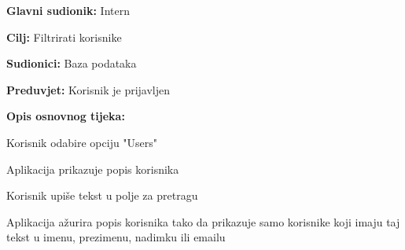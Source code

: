 					\noindent {}
					\begin{packed_item}

						\item \textbf{Glavni sudionik:} Intern
						\item \textbf{Cilj:} Filtrirati korisnike
						\item \textbf{Sudionici:} Baza podataka
						\item \textbf{Preduvjet:} Korisnik je prijavljen
						\item \textbf{Opis osnovnog tijeka:}

						\item[] \begin{packed_enum}

							\item Korisnik odabire opciju "Users"
							\item Aplikacija prikazuje popis korisnika
							\item Korisnik upiše tekst u polje za pretragu
							\item Aplikacija ažurira popis korisnika tako da prikazuje samo korisnike koji imaju taj tekst u imenu, prezimenu, nadimku ili emailu
						\end{packed_enum}
					\end{packed_item}

